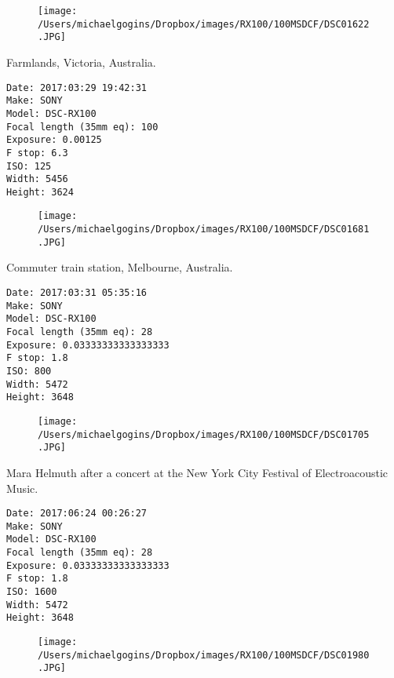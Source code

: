 \documentclass[11pt,letter,DIV=14,paper=landscape]{scrbook}
\begin{document}
\begin{figure}
\texttt{[image: /Users/michaelgogins/Dropbox/images/RX100/100MSDCF/DSC01622.JPG]}
\end{figure}
    
\clearpage
\noindent Farmlands, Victoria, Australia.
\noindent
\begin{lstlisting}
Date: 2017:03:29 19:42:31
Make: SONY
Model: DSC-RX100
Focal length (35mm eq): 100
Exposure: 0.00125
F stop: 6.3
ISO: 125
Width: 5456
Height: 3624
\end{lstlisting}
\clearpage

\begin{figure}
\texttt{[image: /Users/michaelgogins/Dropbox/images/RX100/100MSDCF/DSC01681.JPG]}
\end{figure}
    
\clearpage
\noindent Commuter train station, Melbourne, Australia.
\noindent
\begin{lstlisting}
Date: 2017:03:31 05:35:16
Make: SONY
Model: DSC-RX100
Focal length (35mm eq): 28
Exposure: 0.03333333333333333
F stop: 1.8
ISO: 800
Width: 5472
Height: 3648
\end{lstlisting}
\clearpage

\begin{figure}
\texttt{[image: /Users/michaelgogins/Dropbox/images/RX100/100MSDCF/DSC01705.JPG]}
\end{figure}
    
\clearpage
\noindent Mara Helmuth after a concert at the New York City Festival of Electroacoustic Music.
\noindent
\begin{lstlisting}
Date: 2017:06:24 00:26:27
Make: SONY
Model: DSC-RX100
Focal length (35mm eq): 28
Exposure: 0.03333333333333333
F stop: 1.8
ISO: 1600
Width: 5472
Height: 3648
\end{lstlisting}
\clearpage

\begin{figure}
\texttt{[image: /Users/michaelgogins/Dropbox/images/RX100/100MSDCF/DSC01980.JPG]}
\end{figure}
    
\end{document}
